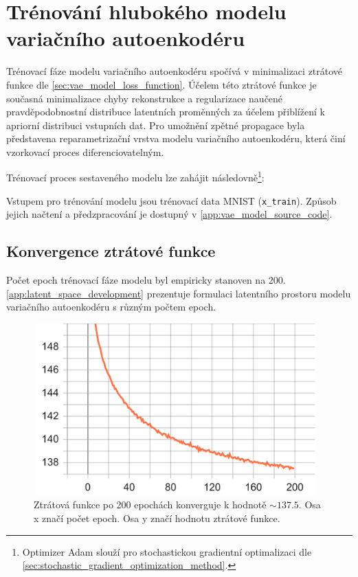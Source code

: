 \section{Trénování hlubokého modelu variačního autoenkodéru}
Trénovací fáze modelu variačního autoenkodéru spočívá v minimalizaci ztrátové funkce dle \autoref{sec:vae_model_loss_function}.
Účelem této ztrátové funkce je současná minimalizace chyby rekonstrukce a regularizace naučené pravděpodobnostní distribuce latentních proměnných za účelem přiblížení k apriorní distribuci vstupních dat.
Pro umožnění zpětné propagace byla představena reparametrizační vrstva modelu variačního autoenkodéru, která činí vzorkovací proces diferenciovatelným.

Trénovací proces sestaveného modelu lze zahájit následovně\footnote{Optimizer Adam slouží pro stochastickou gradientní optimalizaci dle \autoref{sec:stochastic_gradient_optimization_method}.}:


Vstupem pro trénování modelu jsou trénovací data MNIST (\lstinline{x_train}). Způsob jejich načtení a předzpracování je dostupný v \autoref{app:vae_model_source_code}.

\newpage
\subsection{Konvergence ztrátové funkce}
Počet epoch trénovací fáze modelu byl empiricky stanoven na 200. \autoref{app:latent_space_development} prezentuje formulaci latentního prostoru modelu variačního autoenkodéru s různým počtem epoch.
\begin{figure}[H]
    \centering
    \includegraphics[width=0.97\textwidth]{figures/epoch_total_loss.pdf}
    \caption{Ztrátová funkce po 200 epochách konverguje k hodnotě $\sim 137.5$. Osa x značí počet epoch. Osa y značí hodnotu ztrátové funkce.}
\end{figure}

